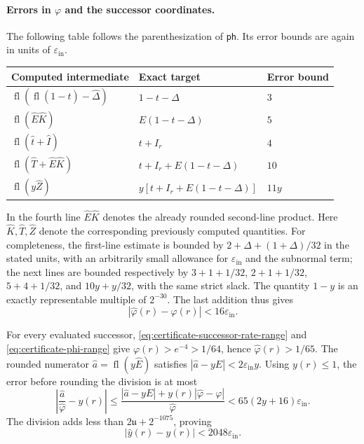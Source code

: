 \paragraph{Errors in $\varphi$ and the successor coordinates.}
The following table follows the parenthesization of
\texttt{ph}. Its error bounds are again in units of
$\varepsilon_{\mathrm{in}}$.
\begin{center}
\begin{tabular}{lll}
\hline
Computed intermediate & Exact target & Error bound\\
\hline
$\operatorname{fl}(\operatorname{fl}(1-\widehat t)-\widehat\Delta)$
 &$1-t-\Delta$ &$3$\\
$\operatorname{fl}(\widehat E\widehat K)$
 &$E(1-t-\Delta)$ &$5$\\
$\operatorname{fl}(\widehat t+\widehat I)$ &$t+I_r$ &$4$\\
$\operatorname{fl}(\widehat T+\widehat E\widehat K)$
 &$t+I_r+E(1-t-\Delta)$ &$10$\\
$\operatorname{fl}(y\widehat Z)$ &$y[t+I_r+E(1-t-\Delta)]$ &$11y$\\
\hline
\end{tabular}
\end{center}
In the fourth line $\widehat E\widehat K$ denotes the already rounded
second-line product. Here $\widehat K,\widehat T,\widehat Z$ denote
the corresponding previously computed quantities.
For completeness, the first-line estimate is bounded by
$2+\Delta+(1+\Delta)/32$ in the stated units, with an arbitrarily
small allowance for $\varepsilon_{\mathrm{in}}$ and the subnormal term;
the next lines are bounded respectively by
$3+1+1/32$, $2+1+1/32$, $5+4+1/32$, and
$10y+y/32$, with the same strict slack.
The quantity $1-y$ is an exactly representable multiple of $2^{-30}$.
The last addition thus gives
\begin{equation}
 |\widehat\varphi(r)-\varphi(r)|
 <16\varepsilon_{\mathrm{in}}.
 \label{eq:certificate-phi-error}
\end{equation}

For every evaluated successor, \eqref{eq:certificate-successor-rate-range}
and \eqref{eq:certificate-phi-range} give
$\varphi(r)>e^{-4}>1/64$, hence
$\widehat\varphi(r)>1/65$.
The rounded numerator $\widehat a=\operatorname{fl}(y\widehat E)$
satisfies $|\widehat a-yE|<2\varepsilon_{\mathrm{in}}y$.
Using $y(r)\le1$, the error before rounding the division is at most
\[
 \left|\frac{\widehat a}{\widehat\varphi}-y(r)\right|
 \le\frac{|\widehat a-yE|+y(r)|\widehat\varphi-\varphi|}
             {\widehat\varphi}
 <65(2y+16)\varepsilon_{\mathrm{in}}.
\]
The division adds less than $2\mathfrak u+2^{-1075}$, proving
\begin{equation}
 |\widehat y(r)-y(r)|<2048\varepsilon_{\mathrm{in}}.
 \label{eq:certificate-successor-y-error}
\end{equation}


